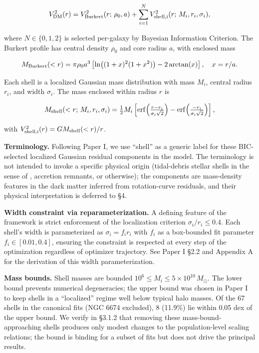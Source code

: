 \documentclass[linenumbers,trackchanges]{aastex701}
\begin{document}
\begin{equation}
V_{\rm DM}^2(r) = V_{\rm Burkert}^2(r;\, \rho_0, a) + \sum_{i=1}^{N} V_{\rm shell,i}^2(r;\, M_i, r_i, \sigma_i),
\end{equation}

where $N \in \{0, 1, 2\}$ is selected per-galaxy by Bayesian Information Criterion. The Burkert profile has central density $\rho_0$ and core radius $a$, with enclosed mass

\begin{equation}
M_{\rm Burkert}(<r) = \pi \rho_0 a^3 \left[ \ln\bigl((1+x)^2 (1+x^2)\bigr) - 2 \arctan(x) \right], \quad x = r/a.
\end{equation}

Each shell is a localized Gaussian mass distribution with mass $M_i$, central radius $r_i$, and width $\sigma_i$. The mass enclosed within radius $r$ is

\begin{equation}
M_{\rm shell}(<r;\, M_i, r_i, \sigma_i) = \tfrac{1}{2} M_i \left[ \mathrm{erf}\!\left(\tfrac{r - r_i}{\sigma_i \sqrt{2}}\right) - \mathrm{erf}\!\left(\tfrac{-r_i}{\sigma_i \sqrt{2}}\right) \right],
\end{equation}

with $V_{\rm shell,i}^2(r) = G M_{\rm shell}(<r) / r$.

\textbf{Terminology.} Following Paper I, we use ``shell'' as a generic label for these BIC-selected localized Gaussian residual components in the model. The terminology is not intended to invoke a specific physical origin (tidal-debris stellar shells in the sense of \citealt{Helmi1999}, accretion remnants, or otherwise); the components are mass-density features in the dark matter inferred from rotation-curve residuals, and their physical interpretation is deferred to \S4.

\textbf{Width constraint via reparameterization.} A defining feature of the framework is strict enforcement of the localization criterion $\sigma_i / r_i \le 0.4$. Each shell's width is parameterized as $\sigma_i = f_i r_i$ with $f_i$ as a box-bounded fit parameter $f_i \in [0.01, 0.4]$, ensuring the constraint is respected at every step of the optimization regardless of optimizer trajectory. See Paper I \S2.2 and Appendix A for the derivation of this width parameterization.

\textbf{Mass bounds.} Shell masses are bounded $10^6 \le M_i \le 5 \times 10^{10}\,M_\odot$. The lower bound prevents numerical degeneracies; the upper bound was chosen in Paper I to keep shells in a ``localized'' regime well below typical halo masses. Of the 67 shells in the canonical fits (NGC 6674 excluded), 8 (11.9\%) lie within 0.05 dex of the upper bound. We verify in \S3.1.2 that removing these mass-bound-approaching shells produces only modest changes to the population-level scaling relations; the bound is binding for a subset of fits but does not drive the principal results.
\end{document}
